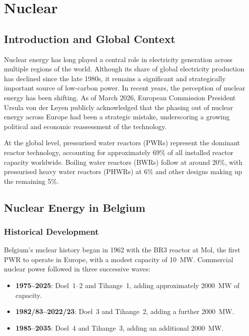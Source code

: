 \chapter{Nuclear}


\section{Introduction and Global Context}

Nuclear energy has long played a central role in electricity generation across multiple regions of the world. Although its share of global electricity production has declined since the late 1980s, it remains a significant and strategically important source of low-carbon power. In recent years, the perception of nuclear energy has been shifting. As of March 2026, European Commission President Ursula von der Leyen publicly acknowledged that the phasing out of nuclear energy across Europe had been a strategic mistake, underscoring a growing political and economic reassessment of the technology.

At the global level, pressurised water reactors (PWRs) represent the dominant reactor technology, accounting for approximately 69\% of all installed reactor capacity worldwide. Boiling water reactors (BWRs) follow at around 20\%, with pressurised heavy water reactors (PHWRs) at 6\% and other designs making up the remaining 5\%.

\section{Nuclear Energy in Belgium}

\subsection{Historical Development}

Belgium's nuclear history began in 1962 with the BR3 reactor at Mol, the first PWR to operate in Europe, with a modest capacity of 10~MW. Commercial nuclear power followed in three successive waves:

\begin{itemize}[noitemsep]
    \item \textbf{1975--2025}: Doel~1--2 and Tihange~1, adding approximately 2000~MW of capacity.
    \item \textbf{1982/83--2022/23}: Doel~3 and Tihange~2, adding a further 2000~MW.
    \item \textbf{1985--2035}: Doel~4 and Tihange~3, adding an additional 2000~MW.
\end{itemize}


